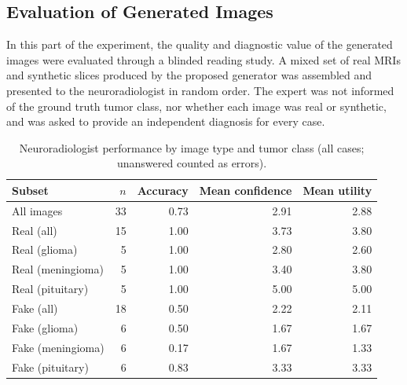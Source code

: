 \subsection{Evaluation of Generated Images}

In this part of the experiment, the quality and diagnostic value of the generated images were evaluated through a blinded reading study. A mixed set of real MRIs and synthetic slices produced by the proposed generator was assembled and presented to the neuroradiologist in random order. The expert was not informed of the ground truth tumor class, nor whether each image was real or synthetic, and was asked to provide an independent diagnosis for every case.


\begin{table}[H]
\centering
\caption{Neuroradiologist performance by image type and tumor class (all cases; unanswered counted as errors).}
\label{tab:hitl_all_cases}
\begin{tabular}{lrrrr}
\toprule
Subset & $n$ & Accuracy & Mean confidence & Mean utility \\
\midrule
All images         & 33 & 0.73 & 2.91 & 2.88 \\
\midrule
Real (all)         & 15 & 1.00 & 3.73 & 3.80 \\
\quad Real (glioma)      &  5 & 1.00 & 2.80 & 2.60 \\
\quad Real (meningioma)  &  5 & 1.00 & 3.40 & 3.80 \\
\quad Real (pituitary)   &  5 & 1.00 & 5.00 & 5.00 \\
\midrule
Fake (all)         & 18 & 0.50 & 2.22 & 2.11 \\
\quad Fake (glioma)      &  6 & 0.50 & 1.67 & 1.67 \\
\quad Fake (meningioma)  &  6 & 0.17 & 1.67 & 1.33 \\
\quad Fake (pituitary)   &  6 & 0.83 & 3.33 & 3.33 \\
\bottomrule
\end{tabular}
\end{table}


